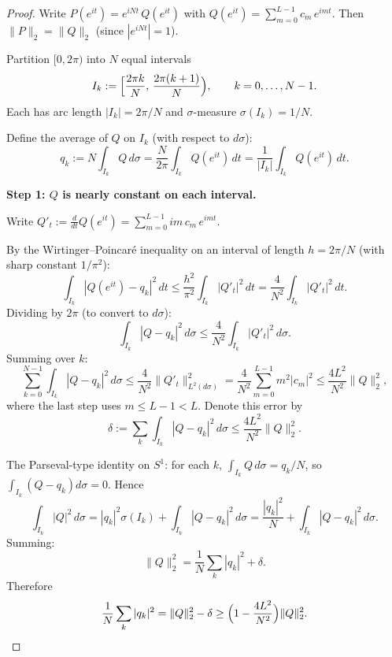 \documentclass[11pt]{article}
\newcommand{\norm}[1]{\lVert #1\rVert}
\begin{document}
\begin{proof}
Write $P(e^{it}) = e^{iNt}\,Q(e^{it})$ with $Q(e^{it}) = \sum_{m=0}^{L-1}c_m\,e^{imt}$.
Then $\norm{P}_2 = \norm{Q}_2$ (since $|e^{iNt}| = 1$).

Partition $[0,2\pi)$ into $N$ equal intervals
\[
  I_k := \Bigl[\frac{2\pi k}{N},\,\frac{2\pi(k+1)}{N}\Bigr),
  \qquad k = 0,\ldots,N-1.
\]
Each has arc length $|I_k| = 2\pi/N$ and $\sigma$-measure $\sigma(I_k) = 1/N$.

Define the average of $Q$ on $I_k$ (with respect to $d\sigma$):
\[
  q_k := N\int_{I_k}Q\,d\sigma
  = \frac{N}{2\pi}\int_{I_k}Q(e^{it})\,dt
  = \frac{1}{|I_k|}\int_{I_k}Q(e^{it})\,dt.
\]

\medskip\noindent\textbf{Step 1: $Q$ is nearly constant on each interval.}

Write $Q'_t := \frac{d}{dt}Q(e^{it}) = \sum_{m=0}^{L-1}im\,c_m\,e^{imt}$.

By the Wirtinger--Poincar\'e inequality on an interval of length $h = 2\pi/N$
(with sharp constant $1/\pi^2$):
\[
  \int_{I_k}|Q(e^{it})-q_k|^2\,dt \le \frac{h^2}{\pi^2}\int_{I_k}|Q'_t|^2\,dt
  = \frac{4}{N^2}\int_{I_k}|Q'_t|^2\,dt.
\]
Dividing by $2\pi$ (to convert to $d\sigma$):
\begin{equation}\label{eq:poincare-sigma}
  \int_{I_k}|Q-q_k|^2\,d\sigma \le \frac{4}{N^2}\int_{I_k}|Q'_t|^2\,d\sigma.
\end{equation}
Summing over $k$:
\[
  \sum_{k=0}^{N-1}\int_{I_k}|Q-q_k|^2\,d\sigma
  \le \frac{4}{N^2}\norm{Q'_t}_{L^2(d\sigma)}^2
  = \frac{4}{N^2}\sum_{m=0}^{L-1}m^2|c_m|^2
  \le \frac{4L^2}{N^2}\norm{Q}_2^2,
\]
where the last step uses $m \le L-1 < L$.
Denote this error by
\begin{equation}\label{eq:delta-def}
  \delta := \sum_k\int_{I_k}|Q-q_k|^2\,d\sigma
  \le \frac{4L^2}{N^2}\norm{Q}_2^2.
\end{equation}

The Parseval-type identity on $S^1$:
for each $k$, $\int_{I_k}Q\,d\sigma = q_k/N$, so
$\int_{I_k}(Q-q_k)d\sigma = 0$.
Hence
\[
  \int_{I_k}|Q|^2\,d\sigma
  = |q_k|^2\sigma(I_k) + \int_{I_k}|Q-q_k|^2\,d\sigma
  = \frac{|q_k|^2}{N} + \int_{I_k}|Q-q_k|^2\,d\sigma.
\]
Summing:
\begin{equation}\label{eq:parseval-partition}
  \norm{Q}_2^2 = \frac{1}{N}\sum_k|q_k|^2 + \delta.
\end{equation}
Therefore
\begin{equation}\label{eq:mean-energy}
  \frac{1}{N}\sum_k|q_k|^2 = \norm{Q}_2^2 - \delta
  \ge \Bigl(1 - \frac{4L^2}{N^2}\Bigr)\norm{Q}_2^2.
\end{equation}


\end{proof}
\end{document}
